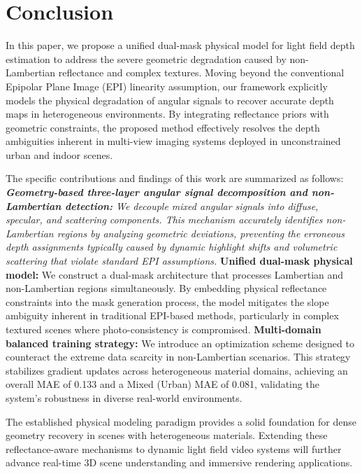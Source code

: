 \section{Conclusion}


In this paper, we propose a unified dual-mask physical model for light field depth estimation to address the severe geometric degradation caused by non-Lambertian reflectance and complex textures. Moving beyond the conventional Epipolar Plane Image (EPI) linearity assumption, our framework explicitly models the physical degradation of angular signals to recover accurate depth maps in heterogeneous environments. By integrating reflectance priors with geometric constraints, the proposed method effectively resolves the depth ambiguities inherent in multi-view imaging systems deployed in unconstrained urban and indoor scenes.

The specific contributions and findings of this work are summarized as follows:
\textit{ \textbf{Geometry-based three-layer angular signal decomposition and non-Lambertian detection:} We decouple mixed angular signals into diffuse, specular, and scattering components. This mechanism accurately identifies non-Lambertian regions by analyzing geometric deviations, preventing the erroneous depth assignments typically caused by dynamic highlight shifts and volumetric scattering that violate standard EPI assumptions.
} \textbf{Unified dual-mask physical model:} We construct a dual-mask architecture that processes Lambertian and non-Lambertian regions simultaneously. By embedding physical reflectance constraints into the mask generation process, the model mitigates the slope ambiguity inherent in traditional EPI-based methods, particularly in complex textured scenes where photo-consistency is compromised.
\textbf{Multi-domain balanced training strategy:} We introduce an optimization scheme designed to counteract the extreme data scarcity in non-Lambertian scenarios. This strategy stabilizes gradient updates across heterogeneous material domains, achieving an overall MAE of 0.133 and a Mixed (Urban) MAE of 0.081, validating the system's robustness in diverse real-world environments.

The established physical modeling paradigm provides a solid foundation for dense geometry recovery in scenes with heterogeneous materials. Extending these reflectance-aware mechanisms to dynamic light field video systems will further advance real-time 3D scene understanding and immersive rendering applications.


